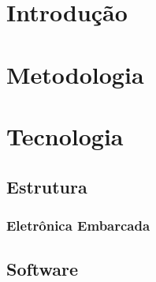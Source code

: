 % 



\chapter{Introdução} %


\chapter{Metodologia}


\chapter{Tecnologia}

\nocite{torres_2006}
\nocite{circuitar_2013}

\section{Estrutura} %


\subsection{Eletrônica Embarcada} %


\section{Software} %

